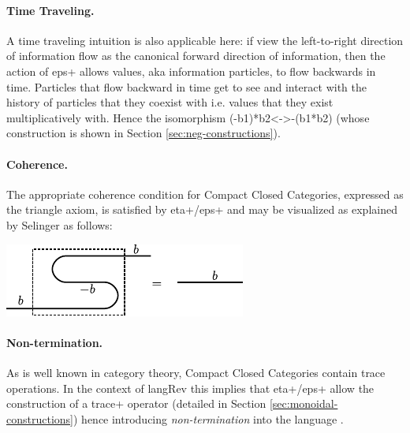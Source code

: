 \documentclass[preprint]{sigplanconf}
\begin{document}
{\begin{multicols}{2}
\begin{center}
\end{center}
  
\begin{center}
\end{center}  
\end{multicols}

\paragraph*{Time Traveling.}
A time traveling intuition is also applicable here: if view the
left-to-right direction of information flow as the canonical forward
direction of information, then the action of {{eps+}} allows values,
aka information particles, to flow backwards in time. Particles that
flow backward in time get to see and interact with the history of
particles that they coexist with i.e. values that they exist
multiplicatively with. Hence the isomorphism {{(-b1)*b2<->-(b1*b2)}}
(whose construction is shown in Section \ref{sec:neg-constructions}).

\paragraph*{Coherence.}
The appropriate coherence condition for Compact Closed Categories,
expressed as the triangle axiom, is satisfied by {{eta+}}/{{eps+}} and
may be visualized as explained by Selinger
\cite{springerlink:10.1007/978-3-642-12821-94} as follows:

\begin{center}
  \includegraphics{diagrams/coherence.pdf}
\end{center}

\paragraph*{Non-termination.}
As is well known in category theory, Compact Closed Categories contain
trace operations.  In the context of {{langRev}} this implies that
{{eta+}}/{{eps+}} allow the construction of a {{trace+}} operator
(detailed in Section \ref{sec:monoidal-constructions}) hence
introducing \emph{non-termination} into the language
\cite{infeffects}.

}
\end{document}
